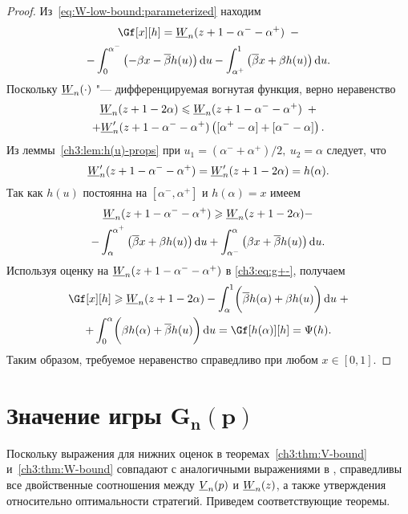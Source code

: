 {\begin{proof}
  Из~\eqref{eq:W-low-bound:parameterized} находим
  \begin{multline}\label{ch3:eq:g+-}
    \Gf[x][h] = \LW{n}(z + 1 - \alpha^- - \alpha^+) \enskip - \\
    - \int_0^{\alpha^-} \left(-\Co x - \DCo h(u)\right) \di u -
    \int_{\alpha^+}^1 \left(\DCo x + \Co h(u)\right) \di u.
  \end{multline}
  Поскольку $\LW{n}(\cdot)$ "--- дифференцируемая вогнутая функция, верно неравенство
  \begin{multline*}
    \LW{n}(z + 1 - 2\alpha) \leqslant \LW{n}(z + 1 - \alpha^- - \alpha^+) \enskip +\\
    + \LW[\prime]{n}(z + 1 - \alpha^- - \alpha^+) \left( [ \alpha^+ - \alpha ] + [
      \alpha^- - \alpha ] \right).
  \end{multline*}
  Из леммы~\ref{ch3:lem:h(u)-props} при $u_1 = (\alpha^- + \alpha^+)/2,\: u_2 = \alpha$ следует, что
  \[
    \LW[\prime]{n}(z + 1 - \alpha^- - \alpha^+) = \LW[\prime]{n}(z + 1 - 2\alpha) =
    h(\alpha).
  \]
  Так как $h(u)$ постоянна на $[\alpha^-, \alpha^+]$ и $h(\alpha) = x$ имеем
  \begin{multline*}
    \LW{n}(z + 1 - \alpha^- - \alpha^+) \geqslant \LW{n}(z + 1 - 2\alpha) - \\
    - \int_\alpha^{\alpha^+} \left( \DCo x + \Co h(u) \right) \di u +
    \int_{\alpha^-}^\alpha \left( \Co x + \DCo h(u) \right) \di u.
  \end{multline*}
  Используя оценку на $\LW{n}(z + 1 - \alpha^- - \alpha^+)$ в \eqref{ch3:eq:g+-}, получаем
  \begin{multline*}
    \Gf[x][h] \geqslant \LW{n}(z + 1 - 2\alpha)
    - \int_\alpha^1 \biggl( \DCo h(\alpha) + \Co h(u) \biggr) \di u \; + \\
    + \int_0^\alpha \biggl( \Co h(\alpha) + \DCo h(u) \biggr) \di u =
    \Gf[h(\alpha)][h] = \Psi(h).
  \end{multline*}
  Таким образом, требуемое неравенство справедливо при любом $x \in [0, 1]$.
\end{proof}

\section{Значение игры $\mathbf{G_n\left(p\right)}$}
\label{ch3:sec:game-value}

Поскольку выражения для нижних оценок в теоремах~\ref{ch3:thm:V-bound} и~\ref{ch3:thm:W-bound} совпадают с аналогичными выражениями в \cite{demeyer02}, справедливы все двойственные соотношения между $\LV{n}(p)$ и $\LW{n}(z)$, а также утверждения относительно оптимальности стратегий.
Приведем соответствующие теоремы.

}
